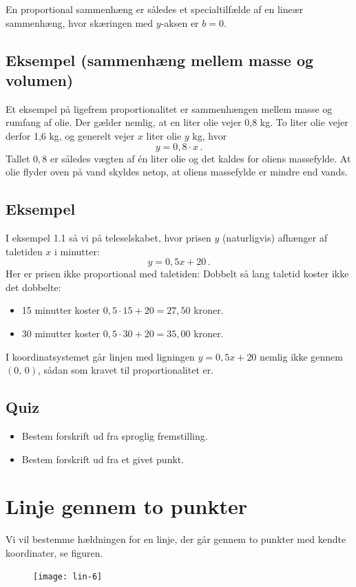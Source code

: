 \documentclass[12pt,oneside,a4paper]{article}
\begin{document}
En proportional sammenhæng er således et specialtilfælde af en lineær sammenhæng, hvor
skæringen med $y$-aksen er $b=0$.

\subsection{Eksempel (sammenhæng mellem masse og volumen)}

Et eksempel på ligefrem proportionalitet er sammenhængen mellem masse og rumfang af olie.
Der gælder nemlig, at en liter olie vejer 0,8 kg. To liter olie vejer derfor 1,6 kg,
og generelt vejer $x$ liter olie $y$ kg, hvor
\[
y = 0,8 \cdot x \,.
\]
Tallet $0,8$ er således vægten af én liter olie og det kaldes for oliens
massefylde.  At olie flyder oven på vand skyldes netop, at oliens massefylde er
mindre end vands.

\subsection{Eksempel}
I eksempel 1.1 så vi på teleselskabet, hvor prisen $y$ (naturligvis) afhænger af
taletiden $x$ i minutter:
\[
y = 0,5x + 20 \,.
\]
Her er prisen ikke proportional med taletiden: Dobbelt så lang taletid koster ikke
det dobbelte:
\begin{itemize}
    \item 15 minutter koster $0,5\cdot 15 + 20 = 27,50$ kroner.
    \item 30 minutter koster $0,5\cdot 30 + 20 = 35,00$ kroner.
\end{itemize}
I koordinatsystemet går linjen med ligningen $y = 0,5x + 20$ nemlig ikke gennem
$(0,\, 0)$, sådan som kravet til proportionalitet er.

\subsection{Quiz}
\begin{itemize}
    \item Bestem forskrift ud fra sproglig fremstilling.
    \item Bestem forskrift ud fra et givet punkt.
\end{itemize}


\section{Linje gennem to punkter}
Vi vil bestemme hældningen for en linje, der går gennem
to punkter med kendte koordinater, se figuren.
\begin{figure}[H]
    \centering
    \texttt{[image: lin-6]}
    \caption{}
\end{figure}
\end{document}
